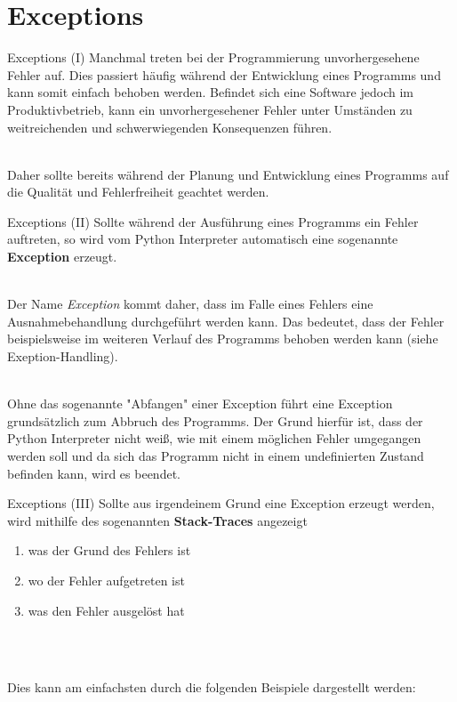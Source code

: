 \newcommand{\decktitle}{Python IV - Weitere Themen}

%
%


		
\section{Exceptions}

    \begin{frame}{Exceptions (I)}
        Manchmal treten bei der Programmierung unvorhergesehene Fehler auf. Dies passiert häufig während der Entwicklung eines Programms und kann somit einfach behoben werden. Befindet sich eine Software jedoch im Produktivbetrieb, kann ein unvorhergesehener Fehler unter Umständen zu weitreichenden und schwerwiegenden Konsequenzen führen. \\~\
        
        Daher sollte bereits während der Planung und Entwicklung eines Programms auf die Qualität und Fehlerfreiheit geachtet werden.
    \end{frame}
    
    \begin{frame}{Exceptions (II)}
        Sollte während der Ausführung eines Programms ein Fehler auftreten, so wird vom Python Interpreter automatisch eine sogenannte \textbf{Exception} erzeugt. \\~\
        
        Der Name \textit{Exception} kommt daher, dass im Falle eines Fehlers eine Ausnahmebehandlung durchgeführt werden kann. Das bedeutet, dass der Fehler beispielsweise im weiteren Verlauf des Programms behoben werden kann (siehe Exeption-Handling). \\~\
        
        Ohne das sogenannte "Abfangen" einer Exception führt eine Exception grundsätzlich zum Abbruch des Programms. Der Grund hierfür ist, dass der Python Interpreter nicht weiß, wie mit einem möglichen Fehler umgegangen werden soll und da sich das Programm nicht in einem undefinierten Zustand befinden kann, wird es beendet.
    \end{frame}
    
    \begin{frame}[fragile]{Exceptions (III)}
        Sollte aus irgendeinem Grund eine Exception erzeugt werden, wird mithilfe des sogenannten \textbf{Stack-Traces} angezeigt
        \begin{enumerate}
            \item was der Grund des Fehlers ist
            \item wo der Fehler aufgetreten ist
            \item was den Fehler ausgelöst hat
        \end{enumerate}
        
        \\~\
        
        Dies kann am einfachsten durch die folgenden Beispiele dargestellt werden:
        
    \end{frame}
    
